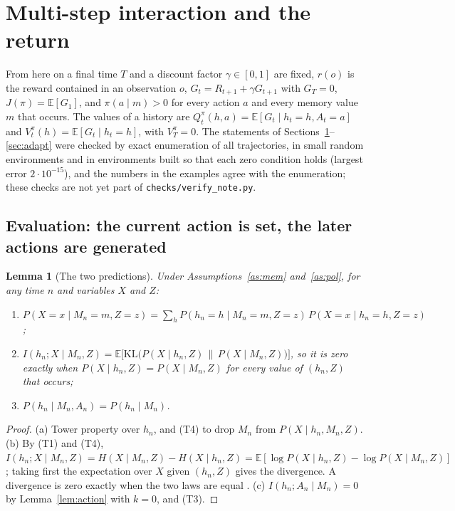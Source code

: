 \documentclass{article}
\newtheorem{lemma}[proposition]{Lemma}
\theoremstyle{definition}
\theoremstyle{remark}
\newcommand{\E}{\mathbb{E}}
\newcommand{\KL}{\mathrm{KL}}
\begin{document}
\section{Multi-step interaction and the return}\label{sec:bellman}

From here on a final time $T$ and a discount factor $\gamma\in[0,1]$ are fixed, $r(o)$ is the reward contained in an observation $o$, $G_t=R_{t+1}+\gamma G_{t+1}$ with $G_T=0$, $J(\pi)=\E[G_1]$, and $\pi(a\mid m)>0$ for every action $a$ and every memory value $m$ that occurs. The values of a history are $Q^\pi_t(h,a)=\E[G_t\mid h_t=h,A_t=a]$ and $V^\pi_t(h)=\E[G_t\mid h_t=h]$, with $V^\pi_T=0$. The statements of Sections~\ref{sec:bellman}--\ref{sec:adapt} were checked by exact enumeration of all trajectories, in small random environments and in environments built so that each zero condition holds (largest error $2\cdot10^{-15}$), and the numbers in the examples agree with the enumeration; these checks are not yet part of \texttt{checks/verify\_note.py}.

\subsection{Evaluation: the current action is set, the later actions are generated}

\begin{lemma}[The two predictions]\label{lem:pred}
Under Assumptions~\ref{as:mem} and~\ref{as:pol}, for any time $n$ and variables $X$ and $Z$:
\begin{enumerate}
\item[(a)] $P(X=x\mid M_n=m,Z=z)=\sum_hP(h_n=h\mid M_n=m,Z=z)\,P(X=x\mid h_n=h,Z=z)$;
\item[(b)] $I(h_n;X\mid M_n,Z)=\E\big[\KL\big(P(X\mid h_n,Z)\,\|\,P(X\mid M_n,Z)\big)\big]$, so it is zero exactly when $P(X\mid h_n,Z)=P(X\mid M_n,Z)$ for every value of $(h_n,Z)$ that occurs;
\item[(c)] $P(h_n\mid M_n,A_n)=P(h_n\mid M_n)$.
\end{enumerate}
\end{lemma}

\begin{proof}
(a) Tower property over $h_n$, and (T4) to drop $M_n$ from $P(X\mid h_n,M_n,Z)$. (b) By (T1) and (T4), $I(h_n;X\mid M_n,Z)=H(X\mid M_n,Z)-H(X\mid h_n,Z)=\E[\log P(X\mid h_n,Z)-\log P(X\mid M_n,Z)]$; taking first the expectation over $X$ given $(h_n,Z)$ gives the divergence. A divergence is zero exactly when the two laws are equal \citep[Theorem~2.6.3]{cover2006elements}. (c) $I(h_n;A_n\mid M_n)=0$ by Lemma~\ref{lem:action} with $k=0$, and (T3).
\end{proof}
\end{document}

